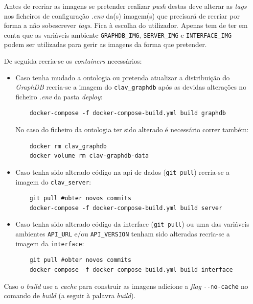 Antes de recriar as imagens se pretender realizar \textit{push} destas deve alterar as \textit{tags} nos ficheiros de configuração \textit{.env} da(s) imagem(s) que precisará de recriar por forma a não sobescrever \textit{tags}. Fica à escolha do utilizador. Apenas tem de ter em conta que as variáveis ambiente \texttt{GRAPHDB\_IMG}, \texttt{SERVER\_IMG} e \texttt{INTERFACE\_IMG} podem ser utilizadas para gerir as imagens da forma que pretender.

De seguida recria-se os \textit{containers} necessários:
\begin{itemize}
    \item Caso tenha mudado a ontologia ou pretenda atualizar a distribuição do \textit{GraphDB} recria-se a imagem do \texttt{clav\_graphdb} após as devidas alterações no ficheiro \textit{.env} da pasta \textit{deploy}:
    \footnotesize
    \begin{verbatim}
    docker-compose -f docker-compose-build.yml build graphdb
    \end{verbatim}
    \normalsize
    \vspace{-0.4cm}
    No caso do ficheiro da ontologia ter sido alterado é necessário correr também:
    \footnotesize
    \begin{verbatim}
    docker rm clav_graphdb
    docker volume rm clav-graphdb-data
    \end{verbatim}
    \normalsize
    \vspace{-0.5cm}
    \item Caso tenha sido alterado código na \acrshort{api} de dados (\verb|git pull|) recria-se a imagem do \texttt{clav\_server}:
    \footnotesize
    \begin{verbatim}
    git pull #obter novos commits
    docker-compose -f docker-compose-build.yml build server
    \end{verbatim}
    \normalsize
    \vspace{-0.5cm}
    \item Caso tenha sido alterado código da interface (\verb|git pull|) ou uma das variáveis ambientes \texttt{API\_URL} e/ou \texttt{API\_VERSION} tenham sido alteradas recria-se a imagem da \texttt{interface}:
    \footnotesize
    \begin{verbatim}
    git pull #obter novos commits
    docker-compose -f docker-compose-build.yml build interface
    \end{verbatim}
    \normalsize
    \vspace{-0.5cm}
\end{itemize}
Caso o \textit{build} use a \textit{cache} para construir as imagens adicione a \textit{flag} \verb|--no-cache| no comando de \textit{build} (a seguir à palavra \textit{build}).

